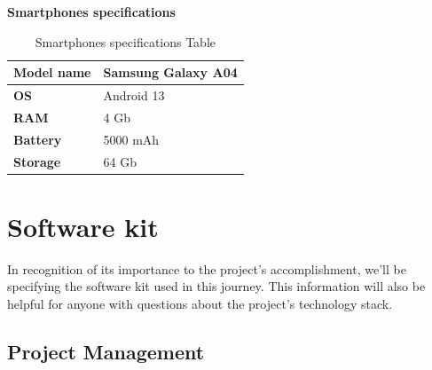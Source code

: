 \begin{large}
    \textbf{Smartphones specifications}
\end{large}

\begin{table}[H]
    \renewcommand{\arraystretch}{1.5}
    \setlength{\belowcaptionskip}{0.25cm}
    

   \begin{tabular}{|p{}|p{}|}
   \hline
    
       \textbf{Model name} & Samsung Galaxy A04 \\ \hline
       \textbf{OS} & Android 13\\ \hline
       \textbf{RAM} & 4 Gb \\ \hline
       \textbf{Battery} &  5000 mAh \\ \hline
       \textbf{Storage} & 64 Gb \\ \hline

\end{tabular}
   
    \caption{Smartphones specifications Table}
    \label{tab:my_label}
\end{table}

\section{Software kit}
In recognition of its importance to the project's accomplishment, we'll be specifying the software  kit  used in this journey.  This information will also be helpful for anyone with questions about the project's technology stack.
\subsection{Project Management}

